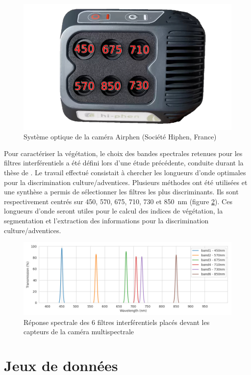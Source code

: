 \documentclass[../thesis.tex]{subfiles}
\begin{document}
    \begin{figure}[H]
        \centering
        \includegraphics[width=0.45\linewidth]{img/preprocessing/airphen-detail4}
        \caption{Système optique de la caméra Airphen (Société Hiphen, France)}
        \label{fig:04-airphen-detail4}
    \end{figure}
    
    Pour caractériser la végétation, le choix des bandes spectrales retenues pour les filtres interférentiels a été défini lors d'une étude précédente, conduite durant la thèse de \cite{MRNL2016}. Le travail effectué consistait à chercher les longueurs d'onde optimales pour la discrimination culture/adventices. Plusieurs méthodes ont été utilisées et une synthèse a permis de sélectionner les filtres les plus discriminants. Ils sont respectivement centrés sur 450, 570, 675, 710, 730 et \SI{850}{nm} (figure \ref{fig:04-sepctral-response}). Ces longueurs d'onde seront utiles pour le calcul des indices de végétation, la segmentation et l'extraction des informations pour la discrimination culture/adventices.
    
    \begin{figure}[H]
        \centering
        \includegraphics[width=\linewidth]{img/material/spectral-response-plt}
        \caption{Réponse spectrale des 6 filtres interférentiels placés devant les capteurs de la caméra multispectrale}
        \label{fig:04-sepctral-response}
    \end{figure}
    
    \section{Jeux de données}
\end{document}
